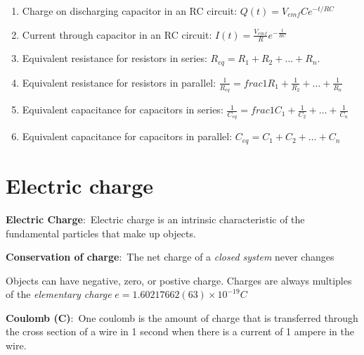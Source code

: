 \documentclass[nobib]{tufte-handout}
\newcommand{\defn}[2]{\noindent\textbf{#1}:\ #2}
\begin{document}
\begin{enumerate}
    \item Charge on discharging capacitor in an RC circuit: $Q(t) = V_{emf} C e^{-t/RC}$
    \item Current through capacitor in an RC circuit: $I(t) = \frac{V_{emf}}{R}e^{-\frac{t}{RC}}$
    \item Equivalent resistance for resistors in series: $R_{eq} = R_1 + R_2 + \dots + R_n$. 
    \item Equivalent resistance for resistors in parallel: $\frac{1}{R_{eq}} =frac{1}{R_1} + \frac{1}{R_2} + \dots + \frac{1}{R_n}$
    \item Equivalent capacitance for capacitors in series: $\frac{1}{C_{eq}} =frac{1}{C_1} + \frac{1}{C_2} + \dots + \frac{1}{C_n}$
    \item Equivalent capacitance for capacitors in parallel: $C_{eq} = C_1 + C_2 + \dots + C_n$
\end{enumerate}

\pagebreak

\pagebreak 

\section{Electric charge}

\defn{Electric Charge}{Electric charge is an intrinsic characteristic of the
fundamental particles that make up objects.}


\defn{Conservation of charge}{The net charge of a \emph{closed system} never changes}

Objects can have negative, zero, or postive charge. 
Charges are always multiples of the \emph{elementary charge} $e = 1.60217662(63) \times 10^{-19} C$

\defn{Coulomb (C)}{One coulomb is the amount of charge that is
transferred through the cross section of a wire in 1 second
when there is a current of 1 ampere in the wire.}
\end{document}
